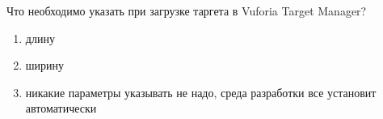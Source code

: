 
Что необходимо указать при загрузке таргета в Vuforia Target Manager?

\begin{enumerate}
    \item длину
    \item ширину
    \item никакие параметры указывать не надо, среда разработки все установит автоматически
\end{enumerate}

